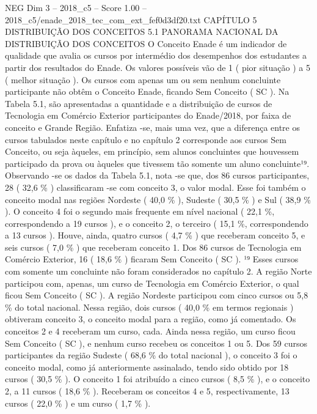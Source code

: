 \begin{textsample}{NEG Dim 3 – 2018\_c5 – Score 1.00 – 2018\_c5/enade\_2018\_tec\_com\_ext\_fef0d3df20.txt}  \label{ex:f3_neg_096}
CAPÍTULO 5 DISTRIBUIÇÃO DOS CONCEITOS 5.1 PANORAMA NACIONAL DA DISTRIBUIÇÃO DOS CONCEITOS O Conceito Enade é um indicador de qualidade que avalia os cursos por intermédio dos desempenhos dos estudantes a partir dos resultados do Enade.
Os valores possíveis vão de 1 ( pior situação ) a 5 ( melhor situação ).
Os cursos com apenas um ou sem nenhum concluinte participante não obtêm o Conceito Enade, ficando Sem Conceito ( SC ).
Na Tabela 5.1, são apresentadas a quantidade e a distribuição de cursos de Tecnologia em Comércio Exterior participantes do Enade/2018, por faixa de conceito e Grande Região.
Enfatiza -se, mais uma vez, que a diferença entre os cursos tabulados neste capítulo e no capítulo 2 corresponde aos cursos Sem Conceito, ou seja àqueles, em princípio, sem alunos concluintes que houvessem participado da prova ou àqueles que tivessem tão somente um aluno concluinte¹⁹.
Observando -se os dados da Tabela 5.1, nota -se que, dos 86 cursos participantes, 28 ( 32,6 \% ) classificaram -se com conceito 3, o valor modal.
Esse foi também o conceito modal nas regiões Nordeste ( 40,0 \% ), Sudeste ( 30,5 \% ) e Sul ( 38,9 \% ).
O conceito 4 foi o segundo mais frequente em nível nacional ( 22,1 \%, correspondendo a 19 cursos ), e o conceito 2, o terceiro ( 15,1 \%, correspondendo a 13 cursos ).
Houve, ainda, quatro cursos ( 4,7 \% ) que receberam conceito 5, e seis cursos ( 7,0 \% ) que receberam conceito 1.
Dos 86 cursos de Tecnologia em Comércio Exterior, 16 ( 18,6 \% ) ficaram Sem Conceito ( SC ). ¹⁹ Esses cursos com somente um concluinte não foram considerados no capítulo 2.
A região Norte participou com, apenas, um curso de Tecnologia em Comércio Exterior, o qual ficou Sem Conceito ( SC ).
A região Nordeste participou com cinco cursos ou 5,8 \% do total nacional.
Nessa região, dois cursos ( 40,0 \% em termos regionais ) obtiveram conceito 3, o conceito modal para a região, como já comentado.
Os conceitos 2 e 4 receberam um curso, cada.
Ainda nessa região, um curso ficou Sem Conceito ( SC ), e nenhum curso recebeu os conceitos 1 ou 5.
Dos 59 cursos participantes da região Sudeste ( 68,6 \% do total nacional ), o conceito 3 foi o conceito modal, como já anteriormente assinalado, tendo sido obtido por 18 cursos ( 30,5 \% ).
O conceito 1 foi atribuído a cinco cursos ( 8,5 \% ), e o conceito 2, a 11 cursos ( 18,6 \% ).
Receberam os conceitos 4 e 5, respectivamente, 13 cursos ( 22,0 \% ) e um curso ( 1,7 \% ).

\end{textsample}
